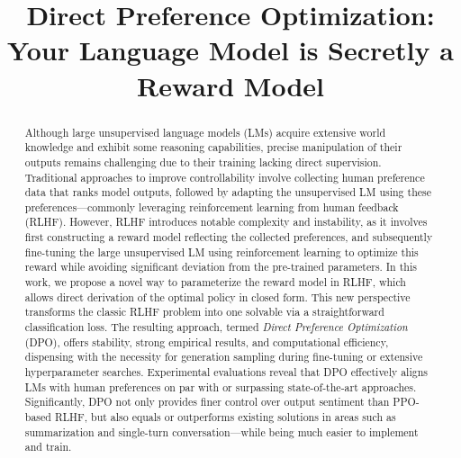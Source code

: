 \title{Direct Preference Optimization: Your Language Model is Secretly a Reward Model}

\begin{abstract}
Although large unsupervised language models (LMs) acquire extensive world knowledge and exhibit some reasoning capabilities, precise manipulation of their outputs remains challenging due to their training lacking direct supervision. Traditional approaches to improve controllability involve collecting human preference data that ranks model outputs, followed by adapting the unsupervised LM using these preferences—commonly leveraging reinforcement learning from human feedback (RLHF). However, RLHF introduces notable complexity and instability, as it involves first constructing a reward model reflecting the collected preferences, and subsequently fine-tuning the large unsupervised LM using reinforcement learning to optimize this reward while avoiding significant deviation from the pre-trained parameters. In this work, we propose a novel way to parameterize the reward model in RLHF, which allows direct derivation of the optimal policy in closed form. This new perspective transforms the classic RLHF problem into one solvable via a straightforward classification loss. The resulting approach, termed \textit{Direct Preference Optimization} (DPO), offers stability, strong empirical results, and computational efficiency, dispensing with the necessity for generation sampling during fine-tuning or extensive hyperparameter searches. Experimental evaluations reveal that DPO effectively aligns LMs with human preferences on par with or surpassing state-of-the-art approaches. Significantly, DPO not only provides finer control over output sentiment than PPO-based RLHF, but also equals or outperforms existing solutions in areas such as summarization and single-turn conversation—while being much easier to implement and train.
\end{abstract}

